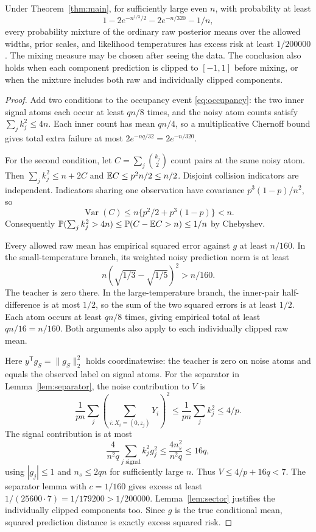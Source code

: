 \begin{corollary}
\label{cor:mixtures}
Under Theorem~\ref{thm:main}, for sufficiently large even $n$, with probability at least
\[
 1-2e^{-n^{1/3}/2}-2e^{-n/320}-1/n,
\]
every probability mixture of the ordinary raw posterior means over the allowed widths, prior scales, and likelihood temperatures has excess risk at least $1/200000$. The mixing measure may be chosen after seeing the data. The conclusion also holds when each component prediction is clipped to $[-1,1]$ before mixing, or when the mixture includes both raw and individually clipped components.
\end{corollary}
\begin{proof}
Add two conditions to the occupancy event \eqref{eq:occupancy}: the two inner signal atoms each occur at least $qn/8$ times, and the noisy atom counts satisfy $\sum_j k_j^2\le4n$. Each inner count has mean $qn/4$, so a multiplicative Chernoff bound gives total extra failure at most $2e^{-nq/32}=2e^{-n/320}$.

For the second condition, let $C=\sum_j\binom{k_j}{2}$ count pairs at the same noisy atom. Then $\sum_jk_j^2\le n+2C$ and $\mathbb E C\le p^2n/2\le n/2$. Disjoint collision indicators are independent. Indicators sharing one observation have covariance $p^3(1-p)/n^2$, so
\[
 \operatorname{Var}(C)\le n\{p^2/2+p^3(1-p)\}<n.
\]
Consequently $\mathbb P(\sum_jk_j^2>4n)\le\mathbb P(C-\mathbb E C>n)\le1/n$ by Chebyshev.

Every allowed raw mean has empirical squared error against $g$ at least $n/160$. In the small-temperature branch, its weighted noisy prediction norm is at least
\[
 n\left(\sqrt{1/3}-\sqrt{1/5}\right)^2>n/160.
\]
The teacher is zero there. In the large-temperature branch, the inner-pair half-difference is at most $1/2$, so the sum of the two squared errors is at least $1/2$. Each atom occurs at least $qn/8$ times, giving empirical total at least $qn/16=n/160$. Both arguments also apply to each individually clipped raw mean.

Here $y^{\mathsf T}g_S=\|g_S\|_2^2$ holds coordinatewise: the teacher is zero on noise atoms and equals the observed label on signal atoms. For the separator in Lemma~\ref{lem:separator}, the noise contribution to $V$ is
\[
 \frac1{pn}\sum_j\left(\sum_{i:X_i=(0,z_j)}Y_i\right)^2
 \le\frac1{pn}\sum_jk_j^2\le4/p.
\]
The signal contribution is at most
\[
 \frac4{n^2q}\sum_{j\text{ signal}}k_j^2g_j^2
 \le\frac{4n_s^2}{n^2q}\le16q,
\]
using $|g_j|\le1$ and $n_s\le2qn$ for sufficiently large $n$. Thus $V\le4/p+16q<7$. The separator lemma with $c=1/160$ gives excess at least $1/(25600\cdot7)=1/179200>1/200000$. Lemma~\ref{lem:sector} justifies the individually clipped components too. Since $g$ is the true conditional mean, squared prediction distance is exactly excess squared risk.
\end{proof}

